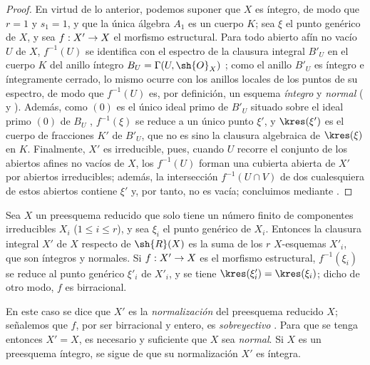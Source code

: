 \documentclass[oneside,10pt]{amsart}
\makeatletter
\renewcommand{\leq}{\leqslant}
\newcommand{\ega@arrow}[2]{\mathchoice{#1}{#2}{#2}{#2}}
\renewcommand{\to}{\ega@arrow{\longrightarrow}{\rightarrow}}
\let\EGAOriginalLabel\label
\renewcommand{\label}[1]{\phantomsection\EGAOriginalLabel{#1}}
\makeatother
\begin{document}
\begin{proof}
En virtud de lo anterior, podemos suponer que $X$ es íntegro, de modo que $r=1$ y $s_1=1$, y que la única álgebra $A_1$ es un cuerpo $K$;
sea $\xi$ el punto genérico de $X$, y sea $f:X'\to X$ el morfismo estructural.
Para todo abierto afín no vacío $U$ de $X$, $f^{-1}(U)$ se identifica con el espectro de la clausura integral $B'_U$ en el cuerpo $K$ del anillo íntegro $B_U=\Gamma(U,\sh{O}_X)$ ;
como el anillo $B'_U$ es íntegro e íntegramente cerrado, lo mismo ocurre con los anillos locales de los puntos de su espectro, de modo que $f^{-1}(U)$ es, por definición, un esquema \emph{íntegro} y \emph{normal} ( y ).
Además, como $(0)$ es el único ideal primo de $B'_U$ situado sobre el ideal primo $(0)$ de $B_U$ \cite[t.~I, p.~259]{I-13}, $f^{-1}(\xi)$ se reduce a un único punto $\xi'$, y $\kres(\xi')$ es el cuerpo de fracciones $K'$ de $B'_U$, que no es sino la clausura algebraica de $\kres(\xi)$ en $K$.
Finalmente, $X'$ es irreducible, pues, cuando $U$ recorre el conjunto de los abiertos afines no vacíos de $X$, los $f^{-1}(U)$ forman una cubierta abierta de $X'$ por abiertos irreducibles;
además, la intersección $f^{-1}(U\cap V)$ de dos cualesquiera de estos abiertos contiene $\xi'$ y, por tanto, no es vacía; concluimos mediante .
\end{proof}

\begin{corollary}[6.3.8]
\label{II.6.3.8}
Sea $X$ un preesquema reducido que solo tiene un número finito de componentes irreducibles $X_i$ ($1\leq i\leq r$), y sea $\xi_i$ el punto genérico de $X_i$.
Entonces la clausura integral $X'$ de $X$ respecto de $\sh{R}(X)$ es la suma de los $r$ $X$-esquemas $X'_i$, que son íntegros y normales.
Si $f:X'\to X$ es el morfismo estructural, $f^{-1}(\xi_i)$ se reduce al punto genérico $\xi'_i$ de $X'_i$, y se tiene $\kres(\xi'_i)=\kres(\xi_i)$; dicho de otro modo, $f$ es birracional.
\end{corollary}

En este caso se dice que $X'$ es la \emph{normalización} del preesquema reducido $X$;
señalemos que $f$, por ser birracional y entero, es \emph{sobreyectivo} .
Para que se tenga entonces $X'=X$, es necesario y suficiente que $X$ sea \emph{normal}.
Si $X$ es un preesquema íntegro, se sigue de  que su normalización $X'$ es íntegra.
\end{document}
